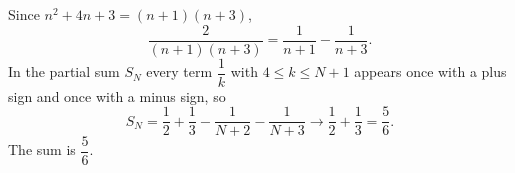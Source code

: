 Since $n^2+4n+3=(n+1)(n+3)$,
\[
\dfrac{2}{(n+1)(n+3)}=\dfrac{1}{n+1}-\dfrac{1}{n+3}.
\]
In the partial sum $S_N$ every term $\dfrac{1}{k}$ with $4\le k\le N+1$ appears once with a plus sign and once with a minus sign, so
\[
S_N=\dfrac{1}{2}+\dfrac{1}{3}-\dfrac{1}{N+2}-\dfrac{1}{N+3}\longrightarrow\dfrac{1}{2}+\dfrac{1}{3}=\dfrac{5}{6} .
\]
The sum is $\boxed{\dfrac{5}{6}}$.
